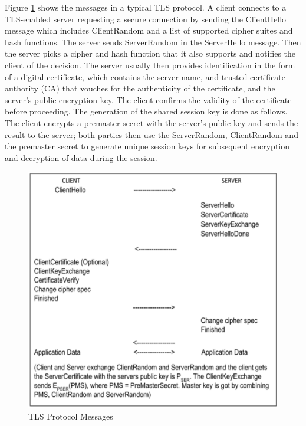 \begin{multicols}{2}
Figure \ref{chap2-fig5} shows the messages in a typical TLS protocol. A client connects to a TLS-enabled server requesting a secure connection by sending the ClientHello message which includes ClientRandom and a list of supported cipher suites and hash functions. The server sends ServerRandom in the ServerHello message. Then the server picks a cipher and hash function that it also supports and notifies the client of the decision. The server usually then provides identification in the form of a digital certificate, which contains the server name, and trusted certificate authority (CA) that vouches for the authenticity of the certificate, and the server's public encryption key. The client confirms the validity of the certificate before proceeding. The generation of the shared session key is done as follows. The client encrypts a premaster secret with the server's public key and sends the result to the server; both parties then use the ServerRandom, ClientRandom and the premaster secret to generate unique session keys for subsequent encryption and decryption of data during the session.
\end{multicols}

\begin{figure}[!ht]
\centering
\includegraphics[scale=.8]{src/Figures/chap2/5.eps}
\caption{TLS Protocol Messages}\label{chap2-fig5}
\end{figure}

